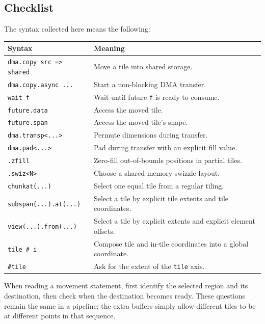\subsection*{Checklist}

The syntax collected here means the following:

\begin{table}[htbp]
\centering\small
\begin{tabularx}{\linewidth}{@{}lX@{}}
\toprule
\textbf{Syntax} & \textbf{Meaning} \\
\midrule
\texttt{dma.\allowbreak{}copy src =\textgreater{} shared} & Move a tile into shared storage. \\
\texttt{dma.\allowbreak{}copy.\allowbreak{}async .\allowbreak{}.\allowbreak{}.\allowbreak{}} & Start a non-blocking DMA transfer. \\
\texttt{wait f} & Wait until future \texttt{f} is ready to consume. \\
\texttt{future.data} & Access the moved tile. \\
\texttt{future.span} & Access the moved tile's shape. \\
\texttt{dma.\allowbreak{}transp\textless{}.\allowbreak{}.\allowbreak{}.\allowbreak{}\textgreater{}} & Permute dimensions during transfer. \\
\texttt{dma.\allowbreak{}pad\textless{}.\allowbreak{}.\allowbreak{}.\allowbreak{}\textgreater{}} & Pad during transfer with an explicit fill value. \\
\texttt{.zfill} & Zero-fill out-of-bounds positions in partial tiles. \\
\texttt{.\allowbreak{}swiz\textless{}N\textgreater{}} & Choose a shared-memory swizzle layout. \\
\texttt{chunkat(...)} & Select one equal tile from a regular tiling. \\
\texttt{subspan(.\allowbreak{}.\allowbreak{}.\allowbreak{}).\allowbreak{}at(.\allowbreak{}.\allowbreak{}.\allowbreak{})} & Select a tile by explicit tile extents and tile coordinates. \\
\texttt{view(.\allowbreak{}.\allowbreak{}.\allowbreak{}).\allowbreak{}from(.\allowbreak{}.\allowbreak{}.\allowbreak{})} & Select a tile by explicit extents and explicit element offsets. \\
\texttt{tile \# i} & Compose tile and in-tile coordinates into a global coordinate. \\
\texttt{\#tile} & Ask for the extent of the \texttt{tile} axis. \\
\bottomrule
\end{tabularx}
\end{table}

When reading a movement statement, first identify the selected region and its destination, then check when the destination becomes ready. These questions remain the same in a pipeline; the extra buffers simply allow different tiles to be at different points in that sequence.
